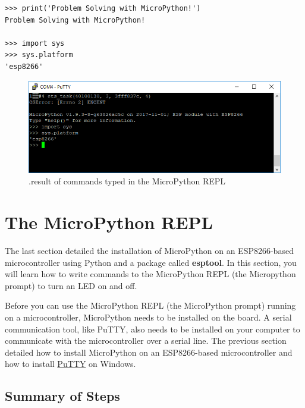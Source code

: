 \documentclass{book}
\makeatletter
\def\maxwidth{\ifdim\Gin@nat@width>\linewidth\linewidth
    \else\Gin@nat@width\fi}
\let\Oldincludegraphics\includegraphics
\renewcommand{\includegraphics}[1]{\Oldincludegraphics[width=.8\maxwidth]{#1}}
\makeatother
\begin{document}
\begin{lstlisting}
>>> print('Problem Solving with MicroPython!')
Problem Solving with MicroPython!

>>> import sys
>>> sys.platform
'esp8266'
\end{lstlisting}

\begin{figure}
\centering
\includegraphics{images/sys_dot_platform.PNG}
\caption{.result of commands typed in the MicroPython REPL}
\end{figure}
    




    
        \section{The MicroPython REPL}\label{the-micropython-repl}
    




    
        The last section detailed the installation of MicroPython on an
ESP8266-based microcontroller using Python and a package called
\textbf{esptool}. In this section, you will learn how to write commands
to the MicroPython REPL (the Micropython prompt) to turn an LED on and
off.

Before you can use the MicroPython REPL (the MicroPython prompt) running
on a microcontroller, MicroPython needs to be installed on the board. A
serial communication tool, like PuTTY, also needs to be installed on
your computer to communicate with the microcontroller over a serial
line. The previous section detailed how to install MicroPython on an
ESP8266-based microcontroller and how to install
\href{https://www.putty.org/}{PuTTY} on Windows.
    




    
        \subsection{Summary of Steps}\label{summary-of-steps}
    
\end{document}
